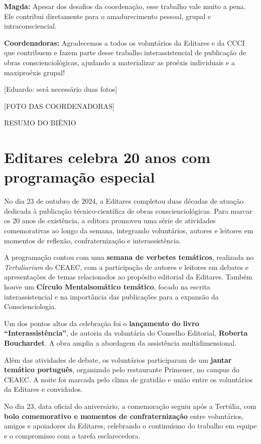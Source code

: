 \documentclass[
]{article}
\begin{document}
\textbf{Magda:} Apesar dos desafios da coordenação, esse trabalho vale muito a pena. Ele contribui diretamente para o amadurecimento pessoal, grupal e intraconsciencial.

\textbf{Coordenadoras:} Agradecemos a todos os voluntários da Editares e da CCCI que contribuem e fazem parte desse trabalho interassistencial de publicação de obras conscienciológicas, ajudando a materializar as proéxis individuais e a maxiproéxis grupal!

{[}Eduardo: será necessário duas fotos{]}

{[}FOTO DAS COORDENADORAS{]}

RESUMO DO BIÊNIO

\section{\texorpdfstring{Editares celebra 20 anos com programação especial }{Editares celebra 20 anos com programação especial }}\label{editares-celebra-20-anos-com-programauxe7uxe3o-especial}

No dia 23 de outubro de 2024, a Editares completou duas décadas de atuação dedicada à publicação técnico-científica de obras conscienciológicas. Para marcar os 20 anos de existência, a editora promoveu uma série de atividades comemorativas ao longo da semana, integrando voluntários, autores e leitores em momentos de reflexão, confraternização e interassistência.

A programação contou com uma \textbf{semana de verbetes temáticos}, realizada no \emph{Tertuliarium} do CEAEC, com a participação de autores e leitores em debates e apresentações de temas relacionados ao propósito editorial da Editares. Também houve um \textbf{Círculo Mentalsomático temático}, focado na escrita interassistencial e na importância das publicações para a expansão da Conscienciologia.

Um dos pontos altos da celebração foi o \textbf{lançamento do livro ``Interassistência''}, de autoria da voluntária do Conselho Editorial, \textbf{Roberta Bouchardet}. A obra amplia a abordagem da assistência multidimensional.

Além das atividades de debate, os voluntários participaram de um \textbf{jantar temático português}, organizado pelo restaurante Primener, no campus do CEAEC. A noite foi marcada pelo clima de gratidão e união entre os voluntários da Editares e convidados.

No dia 23, data oficial do aniversário, a comemoração seguiu após a Tertúlia, com \textbf{bolo comemorativo e momentos de confraternização} entre voluntários, amigos e apoiadores da Editares, celebrando o continuísmo do trabalho em equipe e o compromisso com a tarefa esclarecedora.
\end{document}
